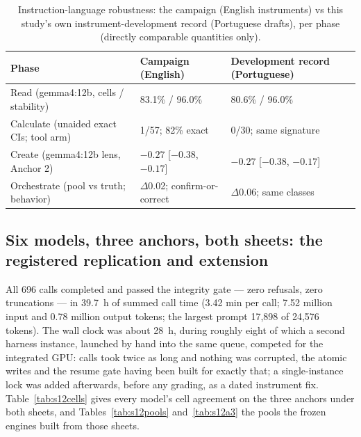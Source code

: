 \documentclass[11pt]{article}
\begin{document}
\begin{table}[H]
\centering\small
\caption{Instruction-language robustness: the campaign (English instruments) vs this study's own instrument-development record (Portuguese drafts), per phase (directly comparable quantities only).}
\label{tab:ablation}
\begin{tabular}{@{}p{5.6cm}p{4.2cm}p{4.0cm}@{}}
\toprule
Phase & Campaign (English) & Development record (Portuguese) \\
\midrule
Read (gemma4:12b, cells / stability) & 83.1\% / 96.0\% & 80.6\% / 96.0\% \\
Calculate (unaided exact CIs; tool arm) & 1/57; 82\% exact & 0/30; same signature \\
Create (gemma4:12b lens, Anchor 2) & $-0.27$ [$-0.38$, $-0.17$] & $-0.27$ [$-0.38$, $-0.17$] \\
Orchestrate (pool vs truth; behavior) & $\Delta$0.02; confirm-or-correct & $\Delta$0.06; same classes \\
\bottomrule
\end{tabular}
\end{table}

\subsection{Six models, three anchors, both sheets: the registered replication and extension}\label{sec:s12res}
All 696 calls completed and passed the integrity gate --- zero refusals, zero truncations --- in 39.7~h of summed call time (3.42 min per call; 7.52 million input and 0.78 million output tokens; the largest prompt 17{,}898 of 24{,}576 tokens). The wall clock was about 28~h, during roughly eight of which a second harness instance, launched by hand into the same queue, competed for the integrated GPU: calls took twice as long and nothing was corrupted, the atomic writes and the resume gate having been built for exactly that; a single-instance lock was added afterwards, before any grading, as a dated instrument fix. Table~\ref{tab:s12cells} gives every model's cell agreement on the three anchors under both sheets, and Tables~\ref{tab:s12pools} and~\ref{tab:s12a3} the pools the frozen engines built from those sheets.
\end{document}
